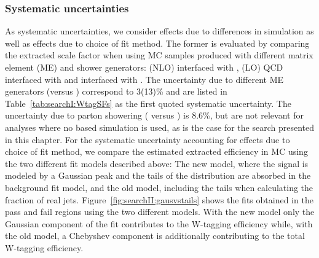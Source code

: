 \subsubsection{Systematic uncertainties}
\label{sec:searchI:wtagsystematic}
As systematic uncertainties, we consider effects due to differences in \ttbar simulation as well as effects due to choice of fit method. The former is evaluated by comparing the extracted scale factor when using \ttbar MC samples produced with different matrix element (ME) and shower generators: \POWHEG (NLO) interfaced with  , \MADGRAPH (LO) QCD interfaced with \HERWIG{++} and \POWHEG interfaced with \HERWIG{++}.
The uncertainty due to different ME generators (\POWHEG versus \MADGRAPH) correspond to 3(13)\% and are listed in Table~\ref{tab:searchI:WtagSFs} as the first quoted systematic uncertainty. The uncertainty due to parton showering ( versus \HERWIG{++}) is 8.6\%, but are not relevant for analyses where no \HERWIG{++} based simulation is used, as is the case for the search presented in this chapter. 
For the systematic uncertainty accounting for effects due to choice of fit method, we compare the estimated extracted efficiency in \ttbar MC using the two different fit models described above: The new model, where the signal is modeled by a Gaussian peak and the tails of the distribution are absorbed in the background fit model, and the old model, including the tails when calculating the fraction of real \PW jets. Figure~\ref{fig:searchII:gausvstails} shows the fits obtained in the pass and fail regions using the two different models. With the new model only the Gaussian component of the fit contributes to the W-tagging efficiency while, with the old model, a Chebyshev component is additionally contributing to the total W-tagging efficiency.
